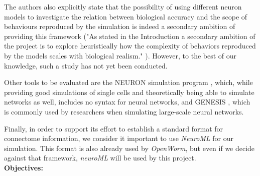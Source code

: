 \documentclass[a4paper,11pt]{article}
\begin{document}
The authors also explicitly state that the possibility of using different neuron models to investigate the relation between biological accuracy and the scope of behaviours reproduced by the simulation is indeed a secondary ambition of providing this framework ("As stated in the Introduction a secondary ambition of the project is to explore heuristically how the complexity of behaviors reproduced by the models scales with biological realism."  \citet{Szigeti2014}). However, to the best of our knowledge, such a study has not yet been conducted.

Other tools to be evaluated are the NEURON simulation program \citep{Hines1994} , which, while providing good simulations of single cells and theoretically being able to simulate networks as well, includes no syntax for neural networks, and GENESIS \citep{Bower2003}, which is commonly used by researchers when simulating large-scale neural networks. 

Finally, in order to support its effort to establish a standard format for connectome information, we consider it important to use \emph{NeuroML} \citep{Gleeson2010} for our simulation. This format is also already used by \emph{OpenWorm}, but even if we decide against that framework, \emph{neuroML} will be used by this project.
\\[0,2cm]

\textbf{Objectives:}
\end{document}
